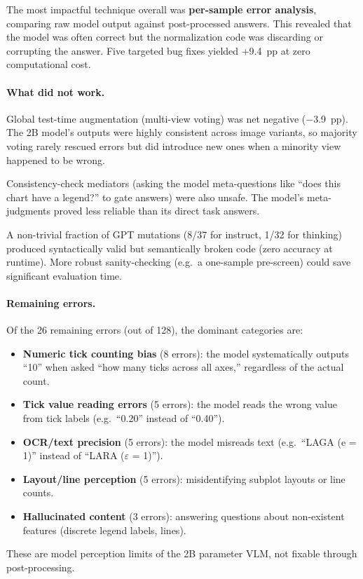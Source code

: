 \documentclass{article}
\begin{document}
The most impactful technique overall was \textbf{per-sample error analysis},
comparing raw model output against post-processed answers. This revealed that
the model was often correct but the normalization code was discarding or
corrupting the answer. Five targeted bug fixes yielded +9.4~pp at zero
computational cost.

\paragraph{What did not work.}
Global test-time augmentation (multi-view voting) was net negative ($-$3.9~pp).
The 2B model's outputs were highly consistent across image variants, so
majority voting rarely rescued errors but did introduce new ones when a minority
view happened to be wrong.

Consistency-check mediators (asking the model meta-questions like ``does this
chart have a legend?'' to gate answers) were also unsafe. The model's
meta-judgments proved less reliable than its direct task answers.

A non-trivial fraction of GPT mutations (8/37 for instruct, 1/32 for thinking)
produced syntactically valid but semantically broken code (zero accuracy at
runtime). More robust sanity-checking (e.g.\ a one-sample pre-screen) could
save significant evaluation time.

\paragraph{Remaining errors.}
Of the 26 remaining errors (out of 128), the dominant categories are:
\begin{itemize}
  \item \textbf{Numeric tick counting bias} (8 errors): the model systematically
    outputs ``10'' when asked ``how many ticks across all axes,'' regardless of
    the actual count.
  \item \textbf{Tick value reading errors} (5 errors): the model reads the wrong
    value from tick labels (e.g.\ ``0.20'' instead of ``0.40'').
  \item \textbf{OCR/text precision} (5 errors): the model misreads text
    (e.g.\ ``LAGA (e = 1)'' instead of ``LARA ($\varepsilon$ = 1)'').
  \item \textbf{Layout/line perception} (5 errors): misidentifying subplot
    layouts or line counts.
  \item \textbf{Hallucinated content} (3 errors): answering questions about
    non-existent features (discrete legend labels, lines).
\end{itemize}
These are model perception limits of the 2B parameter VLM, not fixable through
post-processing.
\end{document}

